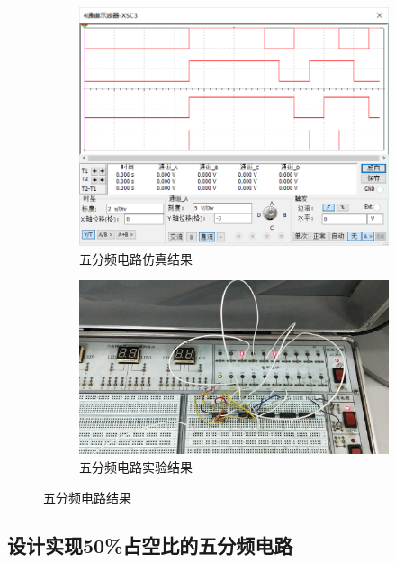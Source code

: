 \documentclass{ctexrep}
\begin{document}
\begin{figure}[htpb]
	\centering
	\begin{subfigure}[htpb]{.45\linewidth}
		\centering
		\includegraphics[width=\linewidth]{452.png}
		\caption{五分频电路仿真结果}
		\label{fig:五分频电路仿真结果}
	\end{subfigure}
	\quad
	\begin{subfigure}[htpb]{.45\linewidth}
		\centering
		\includegraphics[width=\linewidth]{453.png}
		\caption{五分频电路实验结果}
		\label{fig:五分频电路实验结果}
	\end{subfigure}
	\caption{五分频电路结果}
	\label{fig:五分频电路结果}
\end{figure}

\newpage

\subsection{设计实现50\%占空比的五分频电路}%
\label{sub:设计实现50占空比的五分频电路}
\end{document}
